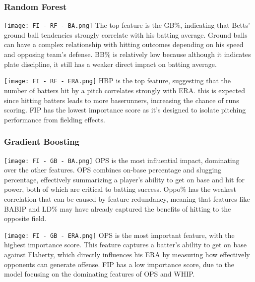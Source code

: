 \documentclass[10pt,twocolumn]{article}
\begin{document}
 

\subsubsection{Random Forest}
{\centering
\texttt{[image: FI - RF - BA.png]}}
The top feature is the GB\%, indicating that Betts’ ground ball tendencies strongly correlate with his batting average. Ground balls can have a complex relationship with hitting outcomes depending on his speed and opposing team’s defense. BB\% is relatively low because although it indicates plate discipline, it still has a weaker direct impact on batting average. 

 
{\centering
\texttt{[image: FI - RF - ERA.png]}}
HBP is the top feature, suggesting that the number of batters hit by a pitch correlates strongly with ERA. this is expected since hitting batters leads to more baserunners, increasing the chance of runs scoring. FIP has the lowest importance score as it’s designed to isolate pitching performance from fielding effects. 

 
\subsubsection{Gradient Boosting}
{\centering
\texttt{[image: FI - GB - BA.png]}}
OPS is the most influential impact, dominating over the other features. OPS combines on-base percentage and slugging percentage, effectively summarizing a player’s ability to get on base and hit for power, both of which are critical to batting success. Oppo\% has the weakest correlation that can be caused by feature redundancy, meaning that features like BABIP and LD\% may have already captured the benefits of hitting to the opposite field. 

 
{\centering
\texttt{[image: FI - GB - ERA.png]}}
OPS is the most important feature, with the highest importance score. This feature captures a batter’s ability to get on base against Flaherty, which directly influences his ERA by measuring how effectively opponents can generate offense. FIP has a low importance score, due to the model focusing on the dominating features of OPS and WHIP. 
\end{document}
